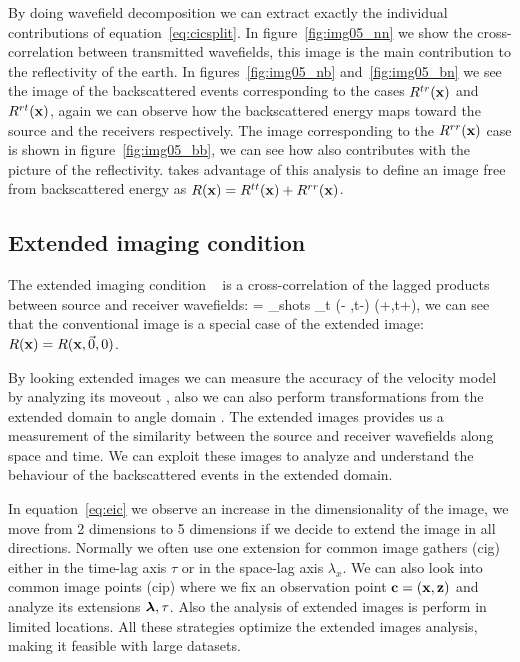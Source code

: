 By doing wavefield decomposition we can extract exactly the individual contributions of equation~\ref{eq:cicsplit}. In 
figure~\ref{fig:img05_nn} we show the cross-correlation between transmitted wavefields, this image is the main contribution
to the reflectivity of the earth. In figures~\ref{fig:img05_nb} and~\ref{fig:img05_bn} we see the image of the backscattered
events corresponding to the cases $R^{tr}({\bf x})$ and $R^{rt}({\bf x})$, again we can observe how the backscattered energy
maps toward the source and the receivers respectively. The image corresponding to the $R^{rr}({\bf x})$ case is shown in 
figure~\ref{fig:img05_bb}, we can see how also contributes with the picture of the reflectivity. \cite{fei:3130} takes 
advantage of this analysis to define an image free from backscattered energy as $R({\bf x})=R^{tt}({\bf x})+R^{rr}({\bf x})$.

\subsection{Extended imaging condition}

The extended imaging condition ~\citep{sava:S209} is a cross-correlation of the lagged products between source
and receiver wavefields:
\beq
\Re= \sum_{shots} \sum_{t} \US(\xx - \hh,t-\tau) \UR(\xx+\hh,t+\tau),
\label{eq:eic}
\eeq
we can see that the conventional image is a special case of the extended image: $R({\bf x})=R({\bf x},\vec{0},0)$.

By looking extended images we can measure the accuracy of the velocity model by analyzing its moveout \citep{yang:S151}, also
we can also perform transformations from the extended domain to angle domain \citep{sava:S209,sava:S131}. The extended 
images provides us a measurement of the similarity between the source and receiver wavefields along space and time.
 We can exploit these images to analyze and understand the behaviour of the backscattered events in the extended domain.

In equation~\ref{eq:eic} we observe an increase in the dimensionality of the image, we move from 2 dimensions to 5 dimensions
if we decide to extend the image in all directions. Normally we often use one extension for common image gathers (cig) either
in the time-lag axis $\tau$ or in the space-lag axis $\lambda_x$. We can also look into common image points (cip) where we 
fix an observation point $\bf c=(x,z)$ and analyze its extensions ${\boldsymbol{\lambda}},\tau$. Also the analysis of extended images is perform 
in limited locations. All these strategies optimize the extended images analysis, making it feasible with large datasets.

